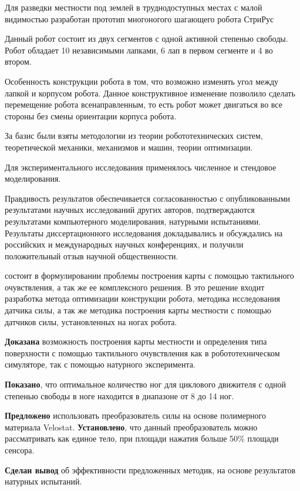 {\researchobj}
Для разведки местности под землей в труднодоступных местах с малой видимостью разработан прототип многоногого шагающего робота СтриРус 

Данный робот состоит из двух сегментов с одной активной степенью свободы. Робот обладает 10 независимыми лапками, 6 лап в первом сегменте и 4 во втором.

Особенность конструкции робота в том, что возможно изменять угол между лапкой и корпусом робота. Данное конструктивное изменение позволило сделать перемещение робота всенаправленным, то есть робот может двигаться во все стороны без смены ориентации корпуса робота.


{\methods} За базис были взяты методологии из теории робототехнических систем, теоретической механики, механизмов и машин, теории оптимизации.

Для экспериментального исследования применялось численное и стендовое моделирования.

{\reliability} Правдивость результатов обеспечивается согласованностью с опубликованными результатами научных исследований других авторов, подтверждаются результатами компьютерного моделирования, натурными испытаниями. Результаты диссертационного исследования докладывались и обсуждались на российских и международных научных конференциях, и получили положительный отзыв научной общественности.


{\novelty} состоит в формулировании проблемы построения карты с помощью тактильного очувствления, а так же ее комплексного решения. В это решение входит разработка метода оптимизации конструкции робота, методика исследования датчика силы, а так же методика построения карты местности с помощью датчиков силы, установленных на ногах робота.

\textbf{Доказана} возможность построения карты местности и определения типа поверхности с помощью тактильного очувствления как в робототехническом симуляторе, так с помощью натурного эксперимента.

\textbf{Показано}, что оптимальное количество ног для циклового движителя с одной степенью свободы в ноге находится в диапазоне от 8 до 14 ног. 

\textbf{Предложено} использовать преобразователь силы на основе полимерного материала Velostat. \textbf{Установлено}, что данный преобразователь можно рассматривать как единое тело, при площади нажатия больше 50\% площади сенсора. 

\textbf{Сделан вывод} об эффективности предложенных методик, на основе результатов натурных испытаний.

